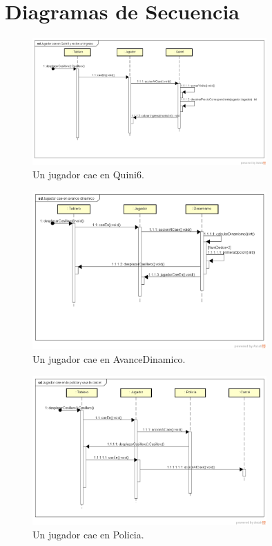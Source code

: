 \documentclass[titlepage,a4paper]{article}
\begin{document}
\section{Diagramas de Secuencia}\label{sec:diagramadesecuencia}

\begin{figure}[H]
\centering
\includegraphics[width=0.8\textwidth]{ALGOPOLY_Jugador_cae_en_Quini6_y_recibe_un_ingreso.png}
\caption{\label{fig:class01}Un jugador cae en Quini6.}
\end{figure}

\begin{figure}[H]
\centering
\includegraphics[width=0.8\textwidth]{ALGOPOLY_Jugador_cae_en_avance_dinamico.png}
\caption{\label{fig:class01}Un jugador cae en AvanceDinamico.}
\end{figure}

\begin{figure}[H]
\centering
\includegraphics[width=0.8\textwidth]{ALGOPOLY_Jugador_cae_en_la_polic_a_y_va_a_la_c_rcel.png}
\caption{\label{fig:class01}Un jugador cae en Policia.}
\end{figure}
\end{document}
